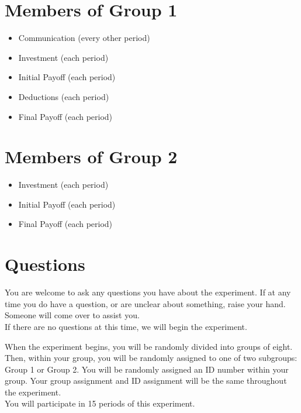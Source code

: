 \documentclass[12pt]{article}
\begin{document}
\section*{Members of Group 1}

\begin{itemize}
\item Communication (every other period)
\item Investment (each period)
\item Initial Payoff (each period)
\item Deductions (each period)
\item Final Payoff (each period)
\end{itemize}

\section*{Members of Group 2}

\begin{itemize}
\item Investment (each period)
\item Initial Payoff (each period)
\item Final Payoff (each period)
\end{itemize}


\section*{Questions}


You are welcome to ask any questions you have about the experiment.  If at any time you do have a question, or are unclear about something, raise your hand. Someone will come over to assist you.\\

If there are no questions at this time, we will begin the experiment.\\ 
\fi


When the experiment begins, you will be randomly divided into groups of eight. Then, within your group, you will be randomly assigned to one of two subgroups: Group 1 or Group 2. You will be randomly assigned an ID number within your group. Your group assignment and ID assignment will be the same throughout the experiment.\\

You will participate in 15 periods of this experiment.\\
\end{document}
